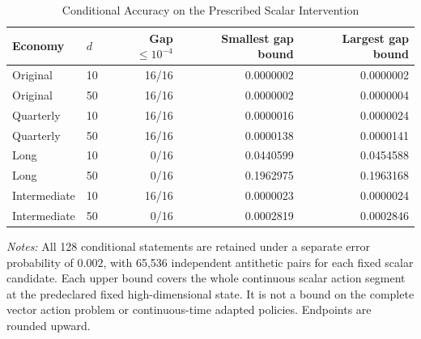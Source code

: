 \begin{table}[!htbp]
\centering\footnotesize
\caption{Conditional Accuracy on the Prescribed Scalar Intervention}\label{tab:r16menuscalar}
\begin{tabular}{llrrr}
\toprule
Economy & $d$ & Gap $\leq10^{-4}$ & Smallest gap bound & Largest gap bound \\
\midrule
Original & 10 & 16/16 & 0.0000002 & 0.0000002 \\
Original & 50 & 16/16 & 0.0000002 & 0.0000004 \\
Quarterly & 10 & 16/16 & 0.0000016 & 0.0000024 \\
Quarterly & 50 & 16/16 & 0.0000138 & 0.0000141 \\
Long & 10 & 0/16 & 0.0440599 & 0.0454588 \\
Long & 50 & 0/16 & 0.1962975 & 0.1963168 \\
Intermediate & 10 & 16/16 & 0.0000023 & 0.0000024 \\
Intermediate & 50 & 0/16 & 0.0002819 & 0.0002846 \\
\bottomrule
\end{tabular}
\begin{minipage}{0.97\linewidth}\footnotesize\emph{Notes:} All 128 conditional statements are retained under a separate error probability of $0.002$, with 65,536 independent antithetic pairs for each fixed scalar candidate. Each upper bound covers the whole continuous scalar action segment at the predeclared fixed high-dimensional state. It is not a bound on the complete vector action problem or continuous-time adapted policies. Endpoints are rounded upward.
\end{minipage}
\end{table}
